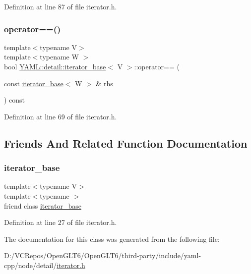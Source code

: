 Definition at line 87 of file iterator.\+h.

\mbox{\label{class_y_a_m_l_1_1detail_1_1iterator__base_a10797ce7d91dc2766f47817540e08463}} 
\subsubsection{\texorpdfstring{operator==()}{operator==()}}
{\footnotesize\ttfamily template$<$typename V$>$ \\
template$<$typename W $>$ \\
bool \mbox{\hyperlink{class_y_a_m_l_1_1detail_1_1iterator__base}{Y\+A\+M\+L\+::detail\+::iterator\+\_\+base}}$<$ V $>$\+::operator== (\begin{DoxyParamCaption}\item[{const \mbox{\hyperlink{class_y_a_m_l_1_1detail_1_1iterator__base}{iterator\+\_\+base}}$<$ W $>$ \&}]{rhs }\end{DoxyParamCaption}) const\hspace{0.3cm}{\ttfamily [inline]}}



Definition at line 69 of file iterator.\+h.



\subsection{Friends And Related Function Documentation}
\mbox{\label{class_y_a_m_l_1_1detail_1_1iterator__base_ab1930cc139d6cbbc031a52082e142122}} 
\subsubsection{\texorpdfstring{iterator\_base}{iterator\_base}}
{\footnotesize\ttfamily template$<$typename V$>$ \\
template$<$typename $>$ \\
friend class \mbox{\hyperlink{class_y_a_m_l_1_1detail_1_1iterator__base}{iterator\+\_\+base}}\hspace{0.3cm}{\ttfamily [friend]}}



Definition at line 27 of file iterator.\+h.



The documentation for this class was generated from the following file\+:\begin{DoxyCompactItemize}
\item 
D\+:/\+V\+C\+Repos/\+Open\+G\+L\+T6/\+Open\+G\+L\+T6/third-\/party/include/yaml-\/cpp/node/detail/\mbox{\hyperlink{detail_2iterator_8h}{iterator.\+h}}\end{DoxyCompactItemize}
